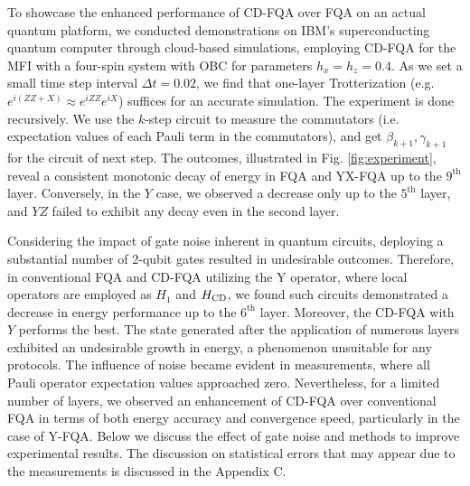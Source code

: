 \documentclass[twocolumn,aps,superscriptaddress,floatfix,longbibliography]{revtex4-2}
\def\YZ{\ensuremath{\mathit{YZ}}\xspace}
\begin{document}
%

To showcase the enhanced performance of CD-FQA over FQA on an
actual quantum platform, we conducted demonstrations
on IBM's
superconducting quantum computer through cloud-based
simulations, employing CD-FQA for the MFI with a four-spin system with OBC for parameters $h_x=h_z=0.4$. As we set a small time step interval $\Delta t=0.02$, we find that one-layer Trotterization (e.g. $e^{i (ZZ+X)}\approx e^{i ZZ}e^{iX}$) suffices for an accurate simulation. The experiment is done recursively. We use the $k$-step circuit to measure the commutators (i.e. expectation values of each Pauli term in the commutators), and get $\beta_{k+1},\gamma_{k+1}$ for the circuit of next step.  The outcomes,
illustrated in Fig. \ref{fig:experiment}, reveal a consistent
monotonic decay of energy in FQA and YX-FQA up to the
$9^{\text{th}}$ layer. Conversely, in the $Y$ case, we observed a
decrease only up to the $5^{\text{th}}$ layer, and \YZ failed to
exhibit any decay even in the second layer.

Considering the impact of gate noise inherent in quantum
circuits, deploying a substantial number of 2-qubit gates
 resulted in undesirable outcomes. Therefore, in conventional FQA 
and CD-FQA utilizing the Y operator, where local operators are
employed as $H_1$ and $H_{\rm CD}$, we found such circuits demonstrated a decrease in energy performance up to the $6^{\text{th}}$ layer. Moreover, the CD-FQA with $Y$ performs the best.
The state generated after the application of numerous layers
exhibited an undesirable growth in energy, a phenomenon
unsuitable for any protocols. The influence of noise became
evident in measurements, where all Pauli operator expectation
values approached zero. Nevertheless, for a limited number of
layers, we observed an enhancement of CD-FQA over conventional
FQA in terms of both energy accuracy and convergence speed,
particularly in the case of Y-FQA. Below we discuss the effect of gate noise and methods to improve experimental results. The discussion on statistical errors that may appear due to the measurements is discussed in the Appendix C.
\end{document}

